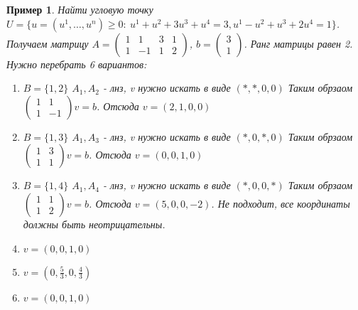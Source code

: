 \documentclass[9pt, a4paper]{extarticle}
\newtheorem*{sample}{Пример}
\begin{document}
	\begin{sample}
		Найти угловую точку $U = \{ u = (u^1, \dots, u^n) \geq 0: \ u^1 + u^2 + 3u^3 + u^4 = 3, u^1 - u^2 + u^3 + 2u^4 = 1\} $. Получаем матрицу $A = \left( \begin{matrix}1& 1&  3&  1 \\ 1&  -1&  1&  2  \end{matrix}\right)$, $b = \left(\begin{matrix}3 \\ 1\end{matrix}\right)$. Ранг матрицы равен 2. Нужно перебрать 6 вариантов:
		\begin{enumerate}
			\item $B = \{1,2\}$ $A_1, A_2$ - лнз, v нужно искать в виде $(*, *, 0, 0)$ Таким обрзаом $\left(\begin{matrix}
				1 & 1\\ 1& -1
			\end{matrix}\right) v = b$. Отсюда $v = (2, 1, 0, 0)$
			\item $B = \{1,3\}$ $A_1, A_3$ - лнз, v нужно искать в виде $(*, 0, *, 0)$ Таким обрзаом $\left(\begin{matrix}
				1 & 3\\ 1& 1
			\end{matrix}\right) v = b$. Отсюда $v = (0, 0, 1, 0)$
			\item $B = \{1,4\}$ $A_1, A_4$ - лнз, v нужно искать в виде $(*, 0, 0, *)$ Таким обрзаом $\left(\begin{matrix}
				1 & 1\\ 1& 2
			\end{matrix}\right) v = b$. Отсюда $v = (5, 0, 0, -2)$. Не подходит, все координаты должны быть неотрицательны.
			\item $v = (0,0,1,0)$
			\item $v = (0, \frac53, 0, \frac43)$
			\item $v = (0,0,1,0)$
		\end{enumerate}
	\end{sample}
\end{document}
